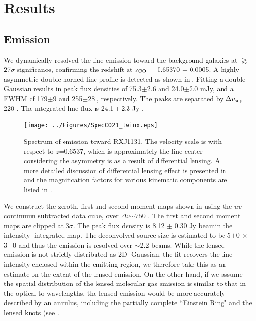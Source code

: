 \documentclass[]{emulateapj}
\begin{document}
\section{Results}
\subsection{\bco Emission} %
We dynamically resolved the \bco line emission toward the background galaxies
at $\gtrsim$27$\sigma$ significance, confirming the redshift at $z_{\rm CO}$ =
0.65370 $\pm$ 0.0005. A highly asymmetric double-horned line profile is
detected as shown in . Fitting a double Gaussian results in peak
flux densities of 75.3$\pm$2.6 and 24.0$\pm$2.0 mJy, and a FWHM of
179$\pm$9 \kms and 255$\pm$28 \kms, respectively. The peaks are separated by
$\Delta v_{\rm sep}$ = 220 \kms. The integrated line flux is 24.1\,$\pm$\,2.3 Jy \kms. %

\begin{figure}[tbph]
\centering
\texttt{[image: ../Figures/SpecCO21\_twinx.eps]}
\caption{ Spectrum of \bco emission toward RXJ1131. The velocity scale
is with respect to $z$=0.6537, which is approximately the line center
considering the asymmetry is as a result of differential lensing.
A more detailed discussion of differential lensing effect is presented in
 and the magnification factors for various kinematic
components are listed in .
 \label{fig:CO21spec}}
\end{figure}

We construct the zeroth, first and second moment maps shown in 
using the $uv$-continuum subtracted data cube, over $\Delta v$$\sim$750 \kms.
The first and second moment maps are clipped at 3$\sigma$.
The peak flux density is 8.12 $\pm$ 0.30 Jy\,\kms\,beam\pmOne in the intensity-
integrated map. The deconvolved source size is estimated to be 5$\pm$0 $\times$ 3$\pm$0 and thus the emission is resolved over
$\sim$2.2 beams. While the lensed emission is not strictly distributed as 2D-
Gaussian, the fit recovers the line intensity enclosed within the emitting
region, we therefore take this as an estimate on the extent of the lensed
emission. On the other hand, if we assume the spatial distribution of
the lensed molecular gas emission is similar to that in the optical to \nir
wavelengths, the lensed emission would be more accurately described by an
annulus, including the partially complete ``Einstein Ring" and
the lensed knots (see .
\end{document}
